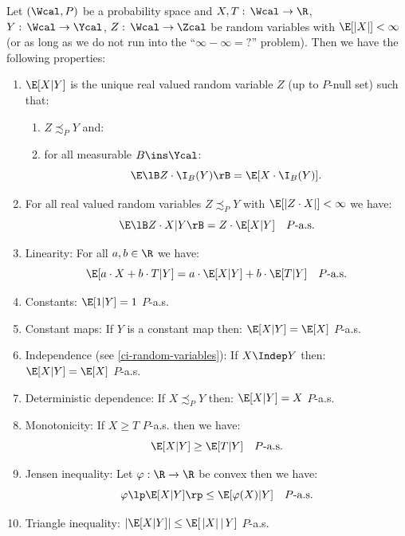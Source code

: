 \begin{Thm}
 Let $(\Wcal,P)$ be a probability space
 and $X,T:\, \Wcal \to \R$, $Y:\,\Wcal \to \Ycal$, $Z:\, \Wcal \to \Zcal$ be random variables with $\E[|X|]< \infty$ (or as long as we do not run into the ``$\infty - \infty=?$'' problem).
    Then we have the following properties:
    \begin{enumerate}
        \item $\E[X|Y]$ is the unique real valued random variable $Z$ (up to $P$-null set)  such that: 
            \begin{enumerate}
                \item $Z \precsim_P Y$ and:
                \item 
            for all measurable $B \ins \Ycal$:            
            \[ \E\lB Z \cdot \I_B(Y) \rB = \E[ X \cdot \I_B(Y)].  \]
            \end{enumerate}
        \item  For all real valued random variables $Z \precsim_P Y$  with $\E[|Z \cdot X|]< \infty$ we have:
            \[ \E\lB Z \cdot X|Y \rB = Z \cdot \E[X|Y] \quad P\text{-a.s.}  \]
        \item Linearity: For all $a,b \in \R$ we have:
            \[ \E[ a \cdot X + b\cdot T|Y] = a \cdot \E[X|Y] + b\cdot\E[T|Y] \quad P\text{-a.s.}  \]
        \item Constants: $\E[1|Y] = 1$ $P$-a.s.
        \item Constant maps: If $Y$ is a constant map then: $\E[X|Y] = \E[X]$ $P$-a.s.
        \item Independence (see \ref{ci-random-variables}): If $X \Indep Y$ then: $\E[X|Y] = \E[X]$ $P$-a.s.    
        \item Deterministic dependence: If $X \precsim_P Y$ then: $\E[X|Y] = X$ $P$-a.s.   
        \item Monotonicity: If $ X \ge T$ $P$-a.s. then we have:
            \[ \E[X|Y] \ge  \E[T|Y] \quad P\text{-a.s.}    \]
        \item Jensen inequality: Let $\varphi: \R \to \R$ be convex then we have:
            \[ \varphi\lp \E[X|Y]\rp \le \E[ \varphi(X)|Y] \quad P\text{-a.s.}   \]
        \item Triangle inequality: $|\E[X|Y]| \le \E[\,|X|\,|\, Y]$ $P$-a.s.

\end{enumerate}
\end{Thm}
